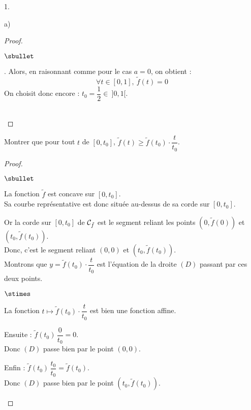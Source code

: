 \begin{noliste}{1.}
\begin{noliste}{a)}
\begin{proof}
\begin{noliste}{$\sbullet$}
      \item {}. Alors, en raisonnant comme pour le 
      cas $a=0$, on obtient :
      \[
        \forall t \in [0,1], \ \tilde{f}(t) =0
      \]
      On choisit donc encore : $t_0=\dfrac{1}{2} \in \ ]0,1[$.
    \end{noliste}
    \conc{Ainsi, il existe toujours $t_0 \in \ ]0,1[$ tel que :
    $\tilde{f}(t_0)=\dmax{t\in [0,1]} \tilde{f}(t)$.}~\\[-1cm]
  \end{proof}

 
  \item Montrer que pour tout $t$ de $[0,t_0]$, $\tilde{f}(t) \geq 
  \tilde{f}(t_0) \cdot \dfrac{t}{t_0}$. 
  
  \begin{proof}~
    \begin{noliste}{$\sbullet$}
      \item La fonction $\tilde{f}$ est concave sur $[0,t_0]$.\\
      Sa courbe représentative est donc située au-dessus de sa corde 
      sur $[0,t_0]$.
      
      \item Or la corde sur $[0,t_0]$ de ${\cal C}_{\tilde{f}}$ est le 
      segment 
      reliant les points $(0,\tilde{f}(0))$ et $(t_0,\tilde{f}(t_0))$.\\
      Donc, c'est le segment reliant 
      $(0,0)$ et $(t_0, \tilde{f}(t_0))$.\\
      Montrons que $y= \tilde{f}(t_0) \cdot \dfrac{t}{t_0}$ est 
      l'équation 
      de la droite $(D)$ passant par ces deux points.
      \begin{noliste}{$\stimes$}
        \item La fonction $t\mapsto \tilde{f}(t_0) \cdot 
	\dfrac{t}{t_0}$ est 
        bien une fonction affine.
        \item Ensuite : $\tilde{f}(t_0) \, \dfrac{0}{t_0} = 0$. \\[.1cm]
        Donc $(D)$ passe bien 
        par le point $(0,0)$.
        \item Enfin : $\tilde{f}(t_0) \, \dfrac{t_0}{t_0} = 
	\tilde{f}(t_0)$. \\[.1cm]
        Donc $(D)$ 
        passe bien par le point $(t_0,\tilde{f}(t_0))$.
      \end{noliste}



\end{noliste}
\end{proof}
\end{noliste}
\end{noliste}
